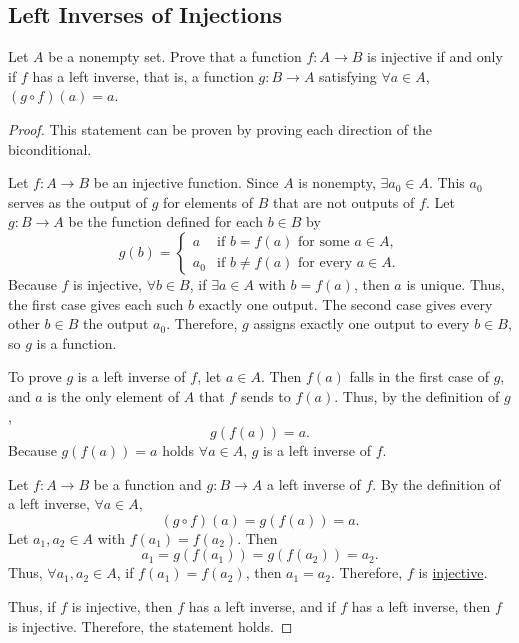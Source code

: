 \subsection{Left Inverses of Injections}
\label{subsections:examples:example5}



\begin{exercise}{
    Let $A$ be a nonempty set. %
    Prove that a function $f \colon A \to B$ is injective if and only if %
    $f$ has a left inverse, that is, %
    a function $g \colon B \to A$ satisfying $\forall a \in A$, %
    $(g \circ f)(a) = a$.
}
\end{exercise}



\begin{proof}{
    This statement can be proven by proving each direction of the %
    biconditional.

    \begin{panel}{
        Let $f \colon A \to B$ be an injective function. %
        Since $A$ is nonempty, $\exists a_0 \in A$. %
        This $a_0$ serves as the output of $g$ for elements of $B$ that %
        are not outputs of $f$. %
        Let $g \colon B \to A$ be the function defined for each $b \in B$ by %
        \[
            g(b) =
            \begin{cases}
                a & \text{if } b = f(a) \text{ for some } a \in A, \\
                a_0 & \text{if } b \neq f(a) \text{ for every } a \in A.
            \end{cases}
        \]
        Because $f$ is injective, $\forall b \in B$, %
        if $\exists a \in A$ with $b = f(a)$, then $a$ is unique. %
        Thus, the first case gives each such $b$ exactly one output. %
        The second case gives every other $b \in B$ the output $a_0$. %
        Therefore, $g$ assigns exactly one output to every $b \in B$, %
        so $g$ is a function.

        To prove $g$ is a left inverse of $f$, let $a \in A$. %
        Then $f(a)$ falls in the first case of $g$, %
        and $a$ is the only element of $A$ that $f$ sends to $f(a)$. %
        Thus, by the definition of $g$, %
        \[
            g(f(a)) = a.
        \]
        Because $g(f(a)) = a$ holds $\forall a \in A$, %
        $g$ is a left inverse of $f$.
    }
    \end{panel}

    \begin{panel}{
        Let $f \colon A \to B$ be a function and %
        $g \colon B \to A$ a left inverse of $f$. %
        By the definition of a left inverse, $\forall a \in A$, %
        \[
            (g \circ f)(a) = g(f(a)) = a.
        \]
        Let $a_1, a_2 \in A$ with $f(a_1) = f(a_2)$. %
        Then %
        \[
            a_1 = g(f(a_1)) = g(f(a_2)) = a_2.
        \]
        Thus, $\forall a_1, a_2 \in A$, if $f(a_1) = f(a_2)$, %
        then $a_1 = a_2$. %
        Therefore, $f$ is %
        \hyperref[subsections:techniques:universal:injective]{injective}.
    }
    \end{panel}

    Thus, if $f$ is injective, then $f$ has a left inverse, %
    and if $f$ has a left inverse, then $f$ is injective. %
    Therefore, the statement holds.
}
\end{proof}